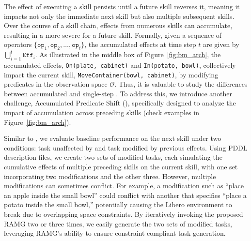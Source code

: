 The effect of executing a skill persists until a future skill reverses it, meaning it impacts not only the immediate next skill but also multiple subsequent skills. Over the course of a skill chain, effects from numerous skills can accumulate, resulting in a more severe \pb for a future skill. Formally, given a sequence of operators $\{\texttt{op}_1, \texttt{op}_2, \dots, \texttt{op}_t\}$, the accumulated effects at time step $t$ are given by $\bigcup_{i=1}^{t} \texttt{Eff}_i$. As illustrated in the middle box of Figure~\ref{fig:bm_arch}, the accumulated effects, \texttt{On(plate, cabinet)} and \texttt{In(potato, bowl)}, collectively impact the current skill, \texttt{MoveContainer(bowl, cabinet)}, by modifying predicates in the observation space $\mathcal{O}$. Thus, it is valuable to study the differences between accumulated \pb and single-step \pb. To address this, we introduce another challenge, Accumulated Predicate Shift (\bmb), specifically designed to analyze the impact of \pb accumulation across preceding skills (check examples in Figure~\ref{fig:bm_arch}).


Similar to \bma, we evaluate baseline performance on the next skill under two conditions: task unaffected by \pb and task modified by previous effects. Using PDDL description files, we create two sets of modified tasks, each simulating the cumulative effects of multiple preceding skills on the current skill, with one set incorporating two modifications and the other three. However, multiple modifications can sometimes conflict. For example, a modification such as ``place an apple inside the small bowl'' could conflict with another that specifies ``place a potato inside the small bowl,'' potentially causing the Libero environment to break due to overlapping space constraints. By iteratively invoking the proposed RAMG two or three times, we easily generate the two sets of modified tasks, leveraging RAMG's ability to ensure constraint-compliant task generation.









